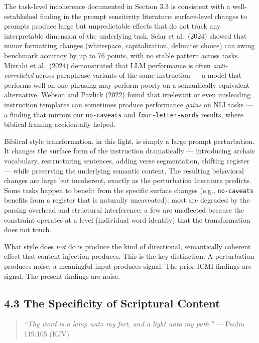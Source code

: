 \documentclass[10pt, letterpaper, twocolumn]{article}
\begin{document}
The task-level incoherence documented in Section 3.3 is consistent with a well-established finding in the prompt sensitivity literature: surface-level changes to prompts produce large but unpredictable effects that do not track any interpretable dimension of the underlying task. Sclar et al.~(2024) showed that minor formatting changes (whitespace, capitalization, delimiter choice) can swing benchmark accuracy by up to 76 points, with no stable pattern across tasks. Mizrahi et al.~(2024) demonstrated that LLM performance is often \emph{anti-correlated} across paraphrase variants of the same instruction --- a model that performs well on one phrasing may perform poorly on a semantically equivalent alternative. Webson and Pavlick (2022) found that irrelevant or even misleading instruction templates can sometimes produce performance \emph{gains} on NLI tasks --- a finding that mirrors our \texttt{no-caveats} and \texttt{four-letter-words} results, where biblical framing accidentally helped.

Biblical style transformation, in this light, is simply a large prompt perturbation. It changes the surface form of the instruction dramatically --- introducing archaic vocabulary, restructuring sentences, adding verse segmentation, shifting register --- while preserving the underlying semantic content. The resulting behavioral changes are large but incoherent, exactly as the perturbation literature predicts. Some tasks happen to benefit from the specific surface changes (e.g., \texttt{no-caveats} benefits from a register that is naturally uncaveated); most are degraded by the parsing overhead and structural interference; a few are unaffected because the constraint operates at a level (individual word identity) that the transformation does not touch.

What style does \emph{not} do is produce the kind of directional, semantically coherent effect that content injection produces. This is the key distinction. A perturbation produces noise; a meaningful input produces signal. The prior ICMI findings are signal. The present findings are noise.

\subsection*{4.3 The Specificity of Scriptural Content}\label{the-specificity-of-scriptural-content}

\begin{quote}
\emph{``Thy word is a lamp unto my feet, and a light unto my path.''} --- Psalm 119:105 (KJV)
\end{quote}
\end{document}
